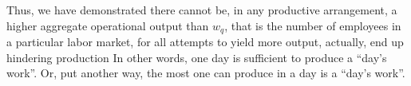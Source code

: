 \documentclass[hidelinks, nonatbib]{elsarticle}
\begin{document}
\begin{enumerate}
    Thus, we have demonstrated there cannot be, in any productive arrangement, a higher aggregate operational output than $w_q$, that is the number of employees in a particular labor market, for all attempts to yield more output, actually, end up hindering production
        In other words, one day is sufficient to produce a ``day's work''. Or, put another way, the most one can produce in a day is a ``day's work''.


\end{enumerate}
\end{document}
